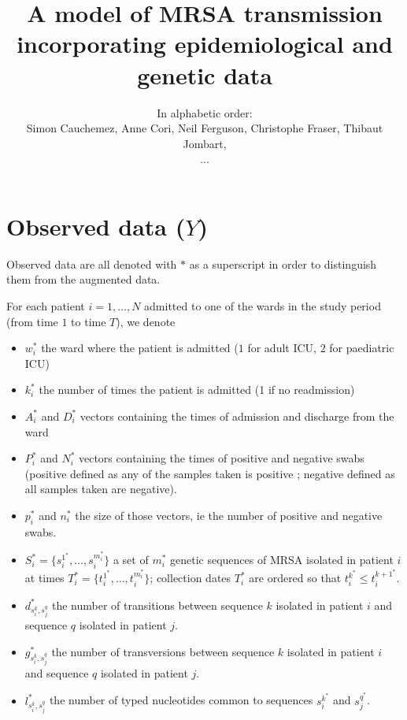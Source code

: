 \documentclass[10pt]{article}
\author{In alphabetic order: \\Simon Cauchemez, Anne Cori, Neil Ferguson, Christophe Fraser, Thibaut Jombart,\\...}
\title{A model of MRSA transmission incorporating epidemiological and genetic data}
\begin{document}
\maketitle

\section*{Observed data ($Y$)}

Observed data are all denoted with $*$ as a superscript in order to distinguish them from the augmented data.

For each patient $i=1,\ldots,N$ admitted to one of the wards in the study period (from time $1$ to time $T$), we denote 
\begin{itemize}
	\item $w_i^*$ the ward where the patient is admitted ($1$ for adult ICU, $2$ for paediatric ICU)
	\item $k_i^*$ the number of times the patient is admitted (1 if no readmission)
	\item $A_i^*$ and $D_i^*$ vectors containing the times of admission and discharge from the ward
	\item $P_i^*$ and $N_i^*$ vectors containing the times of positive and negative swabs (positive defined as any of the samples taken is positive ; negative defined as all samples taken are negative).
	\item $p_i^*$ and $n_i^*$ the size of those vectors, ie the number of positive and negative swabs.
 	\item $S_i^* = \{s_i^{1^*}, \ldots, s_i^{m_i^*}\}$ a set of $m_i^*$ genetic sequences of MRSA isolated in patient $i$ at times 
$T_i^* = \{t_i^{1^*}, \ldots, t_i^{m_i^*}\}$; collection dates $T_i^*$ are ordered so that $t_i^{k^*} \leq t_i^{k+1^*}$.
 	\item $d_{s_i^k,s_j^q}^*$ the number of transitions between sequence $k$ isolated in patient $i$ and sequence $q$ isolated in patient $j$.
	\item $g_{s_i^k,s_j^q}^*$ the number of transversions between sequence $k$ isolated in patient $i$ and sequence $q$ isolated in patient $j$.
	\item $l_{s_i^k,s_j^q}^*$ the number of typed nucleotides common to sequences $s_i^{k^*}$ and $s_j^{q^*}$.
\end{itemize}
\end{document}

